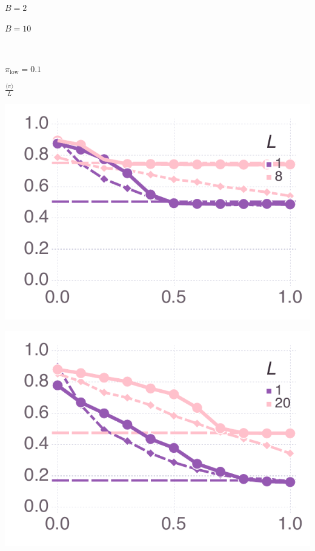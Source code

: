 \documentclass[varwidth=true,crop=false]{standalone}
\newcommand{\pisub}[1]{\pi_{\mathrm{#1}}}
\newcommand{\pilow}{\pisub{low}}
\newcommand{\meanvar}[1]{\langle #1 \rangle}
\newcommand{\meanpi}{\meanvar{\pi}}
\begin{document}
    \begin{minipage}{3.75in}
      \centering
      {\hspace{5.25em}\huge $B = 2$}
    \end{minipage}%
    \begin{minipage}{3.75in}
      \centering
      {\hspace{2.0em}\huge $B = 10$}
    \end{minipage}~\\

    \begin{minipage}{3.75in}
    \begin{rotate}{90}
      {\parbox{2.5in}{
          \centering
          \vspace{-2.5em} {\huge$ \pilow = 0.1$} \\
          {\begin{rotate}{-90}{\huge $\frac{\meanpi}{L}$}\hspace{3em}\end{rotate}}
      }}
    \end{rotate}%
    \hspace{2em}
      \includegraphics[width=\textwidth]{Figures/mean_prev_net_payoff_over_u_lowpayoff=0.1_nbehaviors=2.pdf}
    \end{minipage}\noindent\begin{minipage}{3.75in}%
      \includegraphics[width=\textwidth]{Figures/mean_prev_net_payoff_over_u_lowpayoff=0.1_nbehaviors=10.pdf}

\end{minipage}
\end{document}
